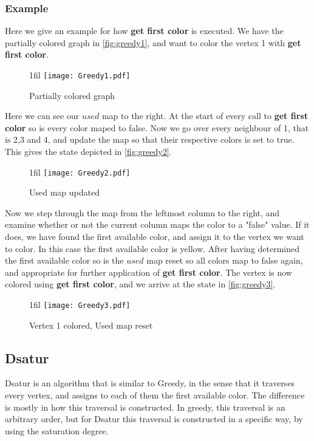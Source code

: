 \documentclass[a4paper]{article}
\makeatletter
\newcommand*{\centerfloat}{%
  \parindent \z@
  \leftskip \z@ \@plus 1fil \@minus \textwidth
  \rightskip\leftskip
  \parfillskip \z@skip}
\makeatother
\begin{document}
\subsubsection{Example}

Here we give an example for how \textbf{get first color} is executed.
We have the partially colored graph in \autoref{fig:greedy1}, and want to color the vertex 
1 with \textbf{get first color}.

\begin{figure}[H]
    \centerfloat
    \texttt{[image: Greedy1.pdf]}
    \caption{Partially colored graph}
    \label{fig:greedy1}
\end{figure}

Here we can see our $used$ map to the right. At the start of every call to
\textbf{get first color} so is every color maped to false. Now we go over every
neighbour of 1, that is 2,3 and 4, and update the map so that their respective
colors is set to true. This gives the state depicted in \autoref{fig:greedy2}.

\begin{figure}[H]
    \centerfloat
    \texttt{[image: Greedy2.pdf]}
    \caption{Used map updated}
    \label{fig:greedy2}
\end{figure}

Now we step through the map from the leftmost column to the right, and examine
whether or not the current column maps the color to a "false" value. If it does,
we have found the first available color, and assign it to the vertex we want to
color. In this case the first available color is yellow. After having
determined the first available color so is the $used$ map reset so all colors map
to false again, and appropriate for further application of \textbf{get first
color}.  The vertex is now colored using  \textbf{get first color}, and we
arrive at the state in \autoref{fig:greedy3}.

\begin{figure}[H]
    \centerfloat
    \texttt{[image: Greedy3.pdf]}
    \caption{Vertex 1 colored, Used map reset}
    \label{fig:greedy3}
\end{figure}

\FloatBarrier
\subsection{Dsatur}

Dsatur is an algorithm that is similar to Greedy, in the sense that it
traverses every vertex, and assigns to each of them the first available color.
The difference is mostly in how this traversal is constructed. In greedy, this
traversal is an arbitrary order, but for Dsatur this traversal is constructed
in a specific way, by using the saturation degree.
\end{document}
